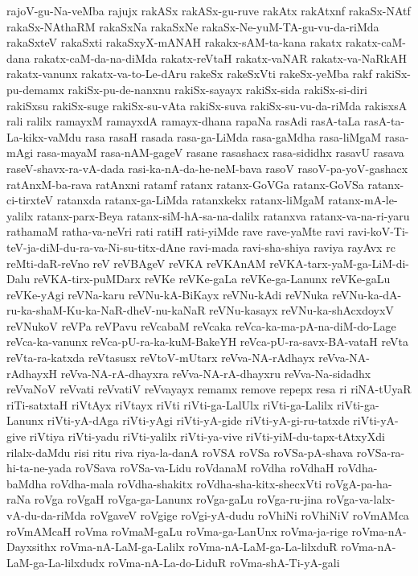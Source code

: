 {rajoV-gu-Na-veMba
rajujx
rakASx
rakASx-gu-ruve
rakAtx
rakAtxnf
rakaSx-NAtf
rakaSx-NAthaRM
rakaSxNa
rakaSxNe
rakaSx-Ne-yuM-TA-gu-vu-da-riMda
rakaSxteV
rakaSxti
rakaSxyX-mANAH
rakakx-sAM-ta-kana
rakatx
rakatx-caM-dana
rakatx-caM-da-na-diMda
rakatx-reVtaH
rakatx-vaNAR
rakatx-va-NaRkAH
rakatx-vanunx
rakatx-va-to-Le-dAru
rakeSx
rakeSxVti
rakeSx-yeMba
rakf
rakiSx-pu-demamx
rakiSx-pu-de-nanxnu
rakiSx-sayayx
rakiSx-sida
rakiSx-si-diri
rakiSxsu
rakiSx-suge
rakiSx-su-vAta
rakiSx-suva
rakiSx-su-vu-da-riMda
rakisxsA
rali
ralilx
ramayxM
ramayxdA
ramayx-dhana
rapaNa
rasAdi
rasA-taLa
rasA-ta-La-kikx-vaMdu
rasa
rasaH
rasada
rasa-ga-LiMda
rasa-gaMdha
rasa-liMgaM
rasa-mAgi
rasa-mayaM
rasa-nAM-gageV
rasane
rasashacx
rasa-sididhx
rasavU
rasava
raseV-shavx-ra-vA-dada
rasi-ka-nA-da-he-neM-bava
rasoV
rasoV-pa-yoV-gashacx
ratAnxM-ba-rava
ratAnxni
ratamf
ratanx
ratanx-GoVGa
ratanx-GoVSa
ratanx-ci-tirxteV
ratanxda
ratanx-ga-LiMda
ratanxkekx
ratanx-liMgaM
ratanx-mA-le-yalilx
ratanx-parx-Beya
ratanx-siM-hA-sa-na-dalilx
ratanxva
ratanx-va-na-ri-yaru
rathamaM
ratha-va-neVri
rati
ratiH
rati-yiMde
rave
rave-yaMte
ravi
ravi-koV-Ti-teV-ja-diM-du-ra-va-Ni-su-titx-dAne
ravi-mada
ravi-sha-shiya
raviya
rayAvx
rc
reMti-daR-reVno
reV
reVBAgeV
reVKA
reVKAnAM
reVKA-tarx-yaM-ga-LiM-di-Dalu
reVKA-tirx-puMDarx
reVKe
reVKe-gaLa
reVKe-ga-Lanunx
reVKe-gaLu
reVKe-yAgi
reVNa-karu
reVNu-kA-BiKayx
reVNu-kAdi
reVNuka
reVNu-ka-dA-ru-ka-shaM-Ku-ka-NaR-dheV-nu-kaNaR
reVNu-kasayx
reVNu-ka-shAcxdoyxV
reVNukoV
reVPa
reVPavu
reVcabaM
reVcaka
reVca-ka-ma-pA-na-diM-do-Lage
reVca-ka-vanunx
reVca-pU-ra-ka-kuM-BakeYH
reVca-pU-ra-savx-BA-vataH
reVta
reVta-ra-katxda
reVtasusx
reVtoV-mUtarx
reVva-NA-rAdhayx
reVva-NA-rAdhayxH
reVva-NA-rA-dhayxra
reVva-NA-rA-dhayxru
reVva-Na-sidadhx
reVvaNoV
reVvati
reVvatiV
reVvayayx
remamx
remove
repepx
resa
ri
riNA-tUyaR
riTi-satxtaH
riVtAyx
riVtayx
riVti
riVti-ga-LalUlx
riVti-ga-Lalilx
riVti-ga-Lanunx
riVti-yA-dAga
riVti-yAgi
riVti-yA-gide
riVti-yA-gi-ru-tatxde
riVti-yA-give
riVtiya
riVti-yadu
riVti-yalilx
riVti-ya-vive
riVti-yiM-du-tapx-tAtxyXdi
rilalx-daMdu
risi
ritu
riva
riya-la-danA
roVSA
roVSa
roVSa-pA-shava
roVSa-ra-hi-ta-ne-yada
roVSava
roVSa-va-Lidu
roVdanaM
roVdha
roVdhaH
roVdha-baMdha
roVdha-mala
roVdha-shakitx
roVdha-sha-kitx-shecxVti
roVgA-pa-ha-raNa
roVga
roVgaH
roVga-ga-Lanunx
roVga-gaLu
roVga-ru-jina
roVga-va-lalx-vA-du-da-riMda
roVgaveV
roVgige
roVgi-yA-dudu
roVhiNi
roVhiNiV
roVmAMca
roVmAMcaH
roVma
roVmaM-gaLu
roVma-ga-LanUnx
roVma-ja-rige
roVma-nA-Dayxsithx
roVma-nA-LaM-ga-Lalilx
roVma-nA-LaM-ga-La-lilxduR
roVma-nA-LaM-ga-La-lilxdudx
roVma-nA-La-do-LiduR
roVma-shA-Ti-yA-gali
}
